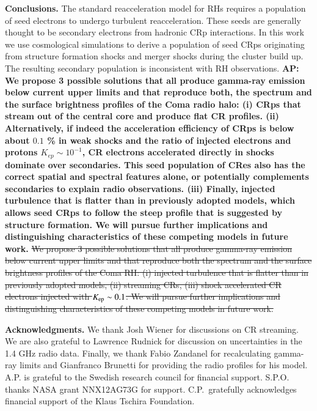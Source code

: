 \documentclass[useAMS,usenatbib]{mn2e}
\def\AP#1{{\bf  AP: #1}}
\begin{document}
{\bf Conclusions.}  The standard reacceleration model for RHs requires
a population of seed electrons to undergo turbulent
reacceleration. These seeds are generally thought to be secondary
electrons from hadronic CRp interactions. In this work we use
cosmological simulations to derive a population of seed CRps
originating from structure formation shocks and merger shocks during
the cluster build up. The resulting secondary population is
inconsistent with RH observations. \AP{We propose 3 possible solutions
  that all produce gamma-ray emission below current upper limits and
  that reproduce both, the spectrum and the surface brightness
  profiles of the Coma radio halo: (i) CRps that stream out of the
  central core and produce flat CR profiles. (ii) Alternatively, if
  indeed the acceleration efficiency of CRps is below about $0.1$ {\%}
  in weak shocks and the ratio of injected electrons and protons
  $K_{ep} \sim 10^{-1}$, CR electrons accelerated directly in shocks
  dominate over secondaries.  This seed population of CRes also has
  the correct spatial and spectral features alone, or potentially
  complements secondaries to explain radio observations. (iii)
  Finally, injected turbulence that is flatter than in previously
  adopted models, which allows seed CRps to follow the steep profile
  that is suggested by structure formation. We will pursue further
  implications and distinguishing characteristics of these competing
  models in future work.} \sout{We propose 3 possible solutions that
  all produce gamma-ray emission below current upper limits and that
  reproduce both the spectrum and the surface brightness profiles of
  the Coma RH: (i) injected turbulence that is flatter than in
  previously adopted models, (ii) streaming CRs, (iii) shock
  accelerated CR electrons injected with $K_{{\mathrm{ep}}} \sim 0.1$. We
  will pursue further implications and distinguishing characteristics
  of these competing models in future work.}

{\bf Acknowledgments.} We thank Josh Wiener for discussions on CR
streaming. We are also grateful to Lawrence Rudnick for discussion on
uncertainties in the 1.4 GHz radio data. Finally, we thank Fabio
Zandanel for recalculating gamma-ray limits and Gianfranco Brunetti
for providing the radio profiles for his model. A.P. is
grateful to the Swedish research council for financial
support. S.P.O. thanks NASA grant NNX12AG73G for
support. C.P.~gratefully acknowledges financial support of the Klaus
Tschira Foundation.
\vspace{-0.7cm}



\end{document}
